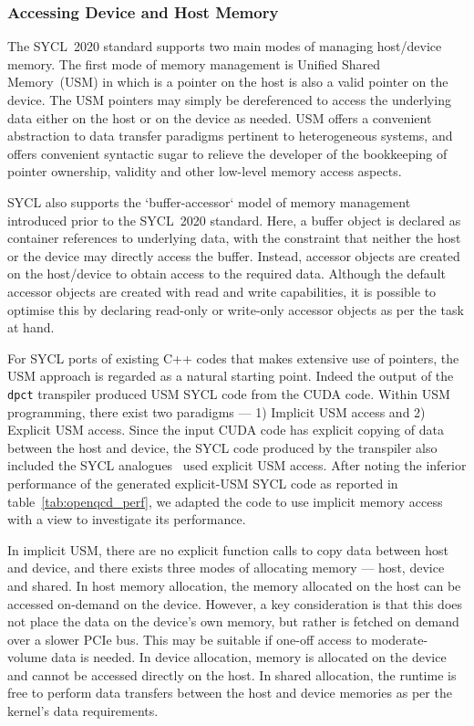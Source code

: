 \documentclass[../main]{subfiles}
\begin{document}
\subsubsection{Accessing Device and Host Memory}\label{sec:openqcd_memoryaccess}

The SYCL~2020 standard supports two main modes of managing host/device memory.
The first mode of memory management is Unified Shared Memory~(USM) in which is a pointer on the host is also a valid pointer on the device.
The USM pointers may simply be dereferenced to access the underlying data either on the host or on the device as needed.
USM offers a convenient abstraction to data transfer paradigms pertinent to heterogeneous systems, and offers convenient syntactic sugar to relieve the developer of the bookkeeping of pointer ownership, validity and other low-level memory access aspects.

SYCL also supports the `buffer-accessor` model of memory management introduced prior to the SYCL~2020 standard.
Here, a buffer object is declared as container references to underlying data, with the constraint that neither the host or the device may directly access the buffer.
Instead, accessor objects are created on the host/device to obtain access to the required data.
Although the default accessor objects are created with read and write capabilities, it is possible to optimise this by declaring read-only or write-only accessor objects as per the task at hand.

For SYCL ports of existing C++ codes that makes extensive use of pointers, the USM approach is regarded as a natural starting point.
Indeed the output of the \texttt{dpct} transpiler produced USM SYCL code from the CUDA code.
Within USM programming, there exist two paradigms --- 1) Implicit USM access and 2) Explicit USM access.
Since the input CUDA code has explicit copying of data between the host and device, the SYCL code produced by the transpiler also included the SYCL analogues \ie~used explicit USM access.
After noting the inferior performance of the generated explicit-USM SYCL code as reported in table~\ref{tab:openqcd_perf}, we adapted the code to use implicit memory access with a view to investigate its performance.

In implicit USM, there are no explicit function calls to copy data between host and device, and there exists three modes of allocating memory --- host, device and shared.
In host memory allocation, the memory allocated on the host can be accessed on-demand on the device.
However, a key consideration is that this does not place the data on the device's own memory, but rather is fetched on demand over a slower PCIe bus.
This may be suitable if one-off access to moderate-volume data is needed.
In device allocation, memory is allocated on the device and cannot be accessed directly on the host.
In shared allocation, the runtime is free to perform data transfers between the host and device memories as per the kernel's data requirements.
\end{document}
